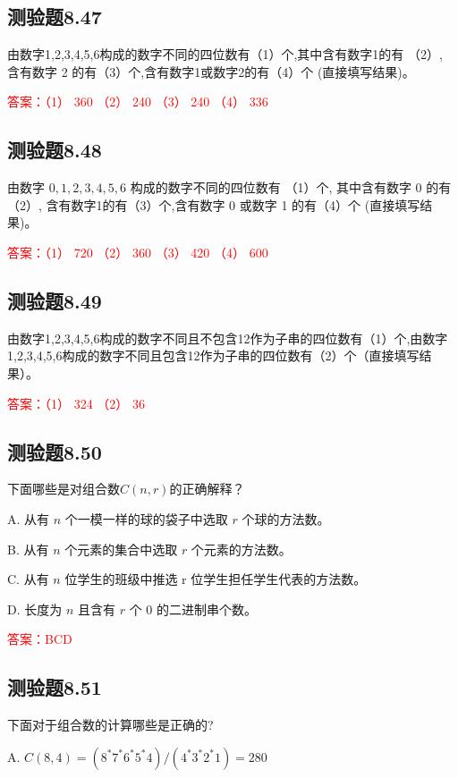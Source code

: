 \documentclass[UTF8, heading=true]{ctexart}
\begin{document}
\subsection{测验题8.47}

由数字1,2,3,4,5,6构成的数字不同的四位数有（1）个,其中含有数字1的有
（2）, 含有数字 2 的有（3）个,含有数字1或数字2的有（4）个 (直接填写结果)。

\textcolor{red}{答案：（1） 360 （2） 240 （3） 240 （4） 336}

\subsection{测验题8.48}

由数字 $0,1,2,3,4,5,6$ 构成的数字不同的四位数有 （1）个, 其中含有数字 0 的有
（2）, 含有数字1的有（3）个,含有数字 0 或数字 1 的有（4）个 (直接填写结果)。

\textcolor{red}{答案：（1） 720 （2） 360 （3） 420 （4） 600}

\subsection{测验题8.49}
由数字1,2,3,4,5,6构成的数字不同且不包含12作为子串的四位数有（1）个,由数字1,2,3,4,5,6构成的数字不同且包含12作为子串的四位数有（2）个（直接填写结果）。

\textcolor{red}{答案：（1） 324 （2） 36}

\subsection{测验题8.50}

下面哪些是对组合数$C(n, r)$的正确解释？

A. 从有 $n$ 个一模一样的球的袋子中选取 $r$ 个球的方法数。

B. 从有 $n$ 个元素的集合中选取 $r$ 个元素的方法数。

C. 从有 $n$ 位学生的班级中推选 r 位学生担任学生代表的方法数。

D. 长度为 $n$ 且含有 $r$ 个 0 的二进制串个数。

\textcolor{red}{答案：BCD}

\subsection{测验题8.51}

下面对于组合数的计算哪些是正确的?

A. $C(8,4)=\left(8^* 7^* 6^* 5^* 4\right) /\left(4^* 3^* 2^* 1\right)=280$
\end{document}
